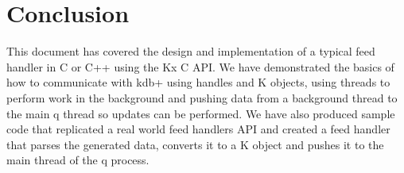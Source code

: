 \chapter{Conclusion}

This document has covered the design and implementation of a typical feed handler in C or C++ using the
Kx C API. We have demonstrated the basics of how to communicate with kdb+ using handles and K objects,
using threads to perform work in the background and pushing data from a background thread to the main
q thread so updates can be performed. We have also produced sample code that replicated a real world feed
handlers API and created a feed handler that parses the generated data, converts it to a K object and pushes
it to the main thread of the q process.